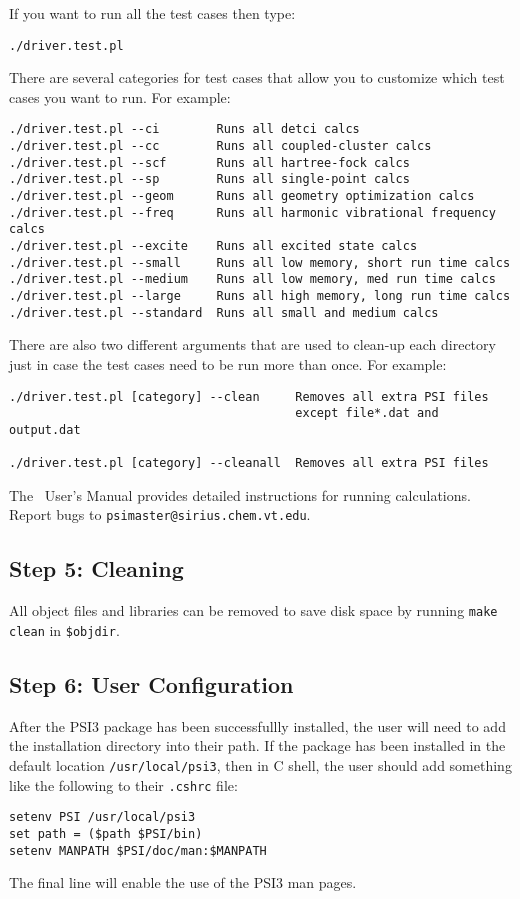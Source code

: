 \documentclass[12pt]{article}
\begin{document}
\noindent
If you want to run all the test cases then type:
\begin{verbatim}
./driver.test.pl
\end{verbatim}
\noindent
There are several categories for test cases that allow you to customize
which test cases you want to run.  For example:
\begin{verbatim}
./driver.test.pl --ci        Runs all detci calcs
./driver.test.pl --cc        Runs all coupled-cluster calcs
./driver.test.pl --scf       Runs all hartree-fock calcs
./driver.test.pl --sp        Runs all single-point calcs
./driver.test.pl --geom      Runs all geometry optimization calcs
./driver.test.pl --freq      Runs all harmonic vibrational frequency calcs
./driver.test.pl --excite    Runs all excited state calcs
./driver.test.pl --small     Runs all low memory, short run time calcs
./driver.test.pl --medium    Runs all low memory, med run time calcs
./driver.test.pl --large     Runs all high memory, long run time calcs
./driver.test.pl --standard  Runs all small and medium calcs
\end{verbatim} 
\noindent
There are also two different arguments that are used to clean-up 
each directory just in case the test cases need to be run more than once.
For example:
\begin{verbatim}
./driver.test.pl [category] --clean     Removes all extra PSI files
                                        except file*.dat and output.dat

./driver.test.pl [category] --cleanall  Removes all extra PSI files
\end{verbatim}
\noindent
The \PSIthree\ User's Manual provides detailed instructions for running 
calculations. Report bugs to {\tt psimaster@sirius.chem.vt.edu}.

\subsection{Step 5: Cleaning}

All object files and libraries can be removed to save disk space by running
{\tt make clean} in {\tt \$objdir}.

\subsection{Step 6: User Configuration}

After the PSI3 package has been successfullly installed, the user will
need to add the installation directory into their path.  If the package
has been installed in the default location {\tt /usr/local/psi3}, then
in C shell, the user should add something like the following to 
their {\tt .cshrc} file:
\begin{verbatim}
setenv PSI /usr/local/psi3
set path = ($path $PSI/bin)
setenv MANPATH $PSI/doc/man:$MANPATH
\end{verbatim}
The final line will enable the use of the PSI3 man pages.
\begin{verbatim}
\end{verbatim}
\end{document}
